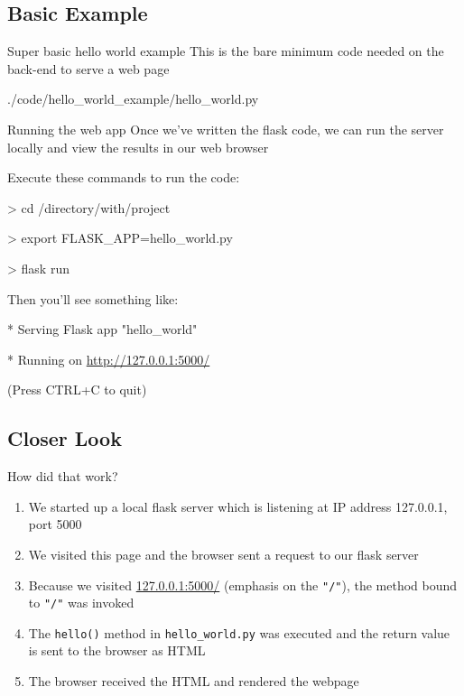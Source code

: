 \documentclass{beamer}
\begin{document}
\subsection{Basic Example}
	\begin{frame}[t]{Super basic hello world example}
		This is the bare minimum code needed on the back-end to serve a web
		page
		\begin{block}{./code/hello\_world\_example/hello\_world.py}
			
		\end{block}
	\end{frame}


	\begin{frame}[t]{Running the web app}
		Once we've written the flask code, we can run the server locally and
		view the results in our web browser

		\begin{block}{Execute these commands to run the code:}
			\begin{semiverbatim}
				> cd /directory/with/project

				> export FLASK\_APP=hello\_world.py

				> flask run
			\end{semiverbatim}
		\end{block}\pause

		\begin{block}{Then you'll see something like:}
			\begin{semiverbatim}
				* Serving Flask app "hello\_world"

				* Running on \url{http://127.0.0.1:5000/}

					(Press CTRL+C to quit)
			\end{semiverbatim}
		\end{block}
	\end{frame}

\subsection{Closer Look}
	\begin{frame}[t]{How did that work?}
		\begin{enumerate}
			\item{We started up a local flask server which is listening at
					IP address 127.0.0.1, port 5000}
			\pause
			\item{We visited this page and the browser sent a request to our
					flask server}
			\pause
			\item{Because we visited \url{127.0.0.1:5000/} (emphasis on the
					\texttt{"/"}), the method bound to \texttt{"/"} was invoked}
			\pause
			\item{The \texttt{hello()} method in \texttt{hello\_world.py} was
					executed and the return value is sent to the browser as
					HTML}
			\pause
			\item{The browser received the HTML and rendered the webpage}
		\end{enumerate}
	\end{frame}
\end{document}
